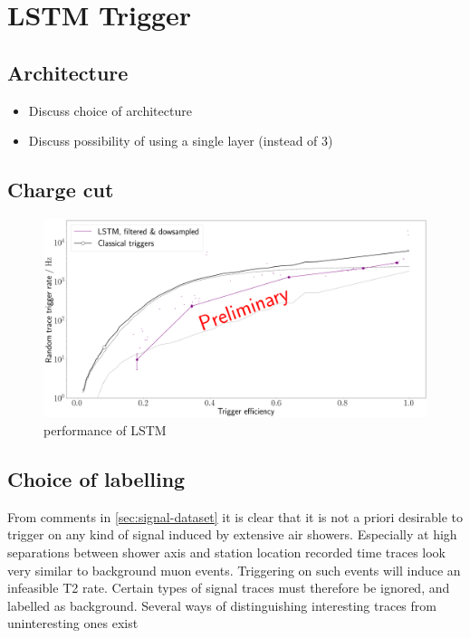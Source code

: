 \section{LSTM Trigger}
\label{sec:lstm-performance}

\subsection{Architecture}
\label{ssec:lstm-architecture}

\begin{itemize}
	\item Discuss choice of architecture
	\item Discuss possibility of using a single layer (instead of 3)
\end{itemize}

\subsection{Charge cut}
\label{ssec:cnn-charge-cut}

\begin{figure}
	\centering
	\includegraphics[width=1\textwidth]{./plots/prelim/LSTM.png}
	\caption{performance of LSTM}
\end{figure}










\subsection{Choice of labelling}
\label{ssec:choice-of-labelling}

From comments in \autoref{sec:signal-dataset} it is clear that it is not a priori desirable to trigger on any kind of signal induced by extensive air showers.
Especially at high separations between shower axis and station location recorded time traces look very similar to background muon events. Triggering on such events
will induce an infeasible T2 rate. Certain types of signal traces must therefore be ignored, and labelled as background. Several ways of distinguishing interesting
traces from uninteresting ones exist

